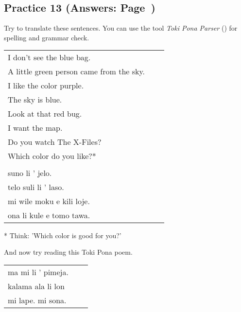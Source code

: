 \subsection*{Practice 13 (Answers: Page~\pageref{'colors'})}
%
Try to translate these sentences. 
You can use the tool \textit{Toki Pona Parser} (\cite{www:rowa:02}) for spelling and grammar check. 

\begin{supertabular}{p{5,5cm}|ll}
I don't see the blue bag. &&   \\ %
A little green person came from the sky. &&   \\ %
I like the color purple.  &&  \\ %
The sky is blue. &&   \\ %
Look at that red bug.  &&  \\ %
I want the map.  &&  \\ %
Do you watch The X-Files? &&  \\  %
Which color do you like?* &&  \\  %
 && \\ %
suno li ' jelo. &&   \\ %
telo suli li ' laso.  &&  \\ %
mi wile moku e kili loje.  &&  \\ %
ona li kule e tomo tawa. &&   \\ %
\end{supertabular} 

* Think: 'Which color is good for you?' 

And now try reading this Toki Pona poem. 

\begin{supertabular}{p{5,5cm}|ll}
ma mi li ' pimeja. && \\ %
kalama ala li lon && \\ %
mi lape. mi sona. && \\ %
\end{supertabular} 
